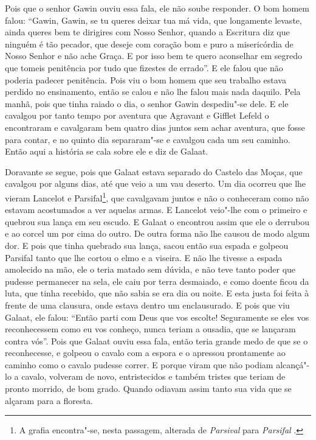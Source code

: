 Pois que o senhor Gawin ouviu essa fala, ele não soube responder. O bom homem
falou: ``Gawin, Gawin, se tu queres deixar tua má vida, que longamente levaste,
ainda queres bem te dirigires com Nosso Senhor, quando a Escritura diz que
ninguém é tão pecador, que deseje com coração bom e puro a misericórdia de
Nosso Senhor e não ache Graça. E por isso bem te quero aconselhar em segredo
que tomeis penitência por tudo que fizestes de errado”. E ele falou que não
poderia padecer penitência. Pois viu o bom homem que seu trabalho estava
perdido no ensinamento, então se calou e não lhe falou mais nada daquilo. Pela
manhã, pois que tinha raiado o dia, o senhor Gawin despediu"-se dele. E ele
cavalgou por tanto tempo por aventura que Agravant e Gifflet Lefeld o
encontraram e cavalgaram bem quatro dias juntos sem achar aventura, que fosse
para contar, e no quinto dia separaram"-se e cavalgou cada um seu caminho. Então
aqui a história se cala sobre ele e diz de Galaat.

Doravante se segue, pois que Galaat estava separado do Castelo das Moças, que
cavalgou por alguns dias, até que veio a um vau deserto. Um dia ocorreu que lhe
vieram Lancelot e Parsifal\footnote{ A grafia encontra"-se, nesta passagem,
alterada de \textit{Parsival} para \textit{Parsifal }.},  que
cavalgavam juntos e não o conheceram como não estavam acostumados a ver aquelas
armas. E Lancelot veio"-lhe com o primeiro e quebrou sua lança em seu escudo. E
Galaat o encontrou assim que ele o derrubou e ao corcel um por cima do outro.
De outra forma não lhe causou de modo algum dor. E pois que tinha quebrado sua
lança, sacou então sua espada e golpeou Parsifal tanto que lhe cortou o elmo e
a viseira. E não lhe tivesse a espada amolecido na mão, ele o teria matado sem
dúvida, e não teve tanto poder que pudesse permanecer na sela, ele caiu por
terra desmaiado, e como doente ficou da luta, que tinha recebido, que não sabia
se era dia ou noite. E esta justa foi feita à frente de uma clausura, onde
estava dentro um enclausurado. E pois que viu Galaat, ele falou: “Então parti
com Deus que vos escolte! Seguramente se eles vos reconhecessem como eu vos
conheço, nunca teriam a ousadia, que se lançaram contra vós”. Pois que Galaat
ouviu essa fala, então teria grande medo de que se o reconhecesse, e golpeou o
cavalo com a espora e o apressou prontamente ao caminho como o cavalo pudesse
correr. E porque viram que não podiam alcançá"-lo a cavalo, volveram de novo,
entristecidos e também tristes que teriam de pronto morrido, de bom grado.
Quando odiavam assim tanto sua vida que se alçaram para a floresta.

